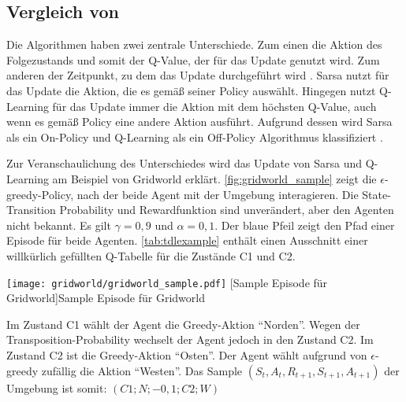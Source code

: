\subsection{Vergleich von \bothAlgs}
\label{chap:vergleich}

Die Algorithmen \bothAlgs haben zwei zentrale Unterschiede. 
Zum einen die Aktion des Folgezustands und somit der Q-Value, der für das Update genutzt wird. 
Zum anderen der Zeitpunkt, zu dem das Update durchgeführt wird \cite{IrelandComparisonThereFundamental}. 
Sarsa nutzt für das Update die Aktion, die es gemäß seiner Policy auswählt. 
Hingegen nutzt Q-Learning für das Update immer die Aktion mit dem höchsten Q-Value, auch wenn es gemäß Policy eine andere Aktion ausführt. 
Aufgrund dessen wird Sarsa als ein On-Policy und Q-Learning als ein Off-Policy Algorithmus klassifiziert \cite[S. 132]{suttonReinforcementLearningIntroduction2018}.

Zur Veranschaulichung des Unterschiedes wird das Update von Sarsa und Q-Learning am Beispiel von Gridworld erklärt. 
\cref{fig:gridworld_sample} zeigt die $\epsilon$-greedy-Policy, nach der beide Agent mit der Umgebung interagieren. 
Die State-Transition Probability und Rewardfunktion sind unverändert, aber den Agenten nicht bekannt.
Es gilt $\gamma=0,9$ und $\alpha=0,1$.
Der blaue Pfeil zeigt den Pfad einer Episode für beide Agenten. 
\cref{tab:tdlexample} enthält einen Ausschnitt einer willkürlich gefüllten Q-Tabelle für die Zustände C1 und C2.

\begin{minipage}{\textwidth}
  \begin{minipage}[b]{0.49\textwidth}
    \centering
    \captionsetup{type=figure}
    \texttt{[image: gridworld/gridworld\_sample.pdf]}
    [Sample Episode für Gridworld]{Sample Episode für Gridworld\protect\footnotemark}
    \label{fig:gridworld_sample}
  \end{minipage}
  \hfill
  \begin{minipage}[b]{0.49\textwidth}
    \centering
    \captionsetup{type=table}
    
    \label{tab:tdlexample}
    \end{minipage}
\end{minipage}

Im Zustand C1 wählt der Agent die Greedy-Aktion “Norden”. Wegen der Transposition-Probability wechselt der Agent jedoch in den Zustand C2. Im Zustand C2 ist die Greedy-Aktion “Osten”. Der Agent wählt aufgrund von $\epsilon$-greedy zufällig die Aktion “Westen”. Das Sample $(S_t,A_t,R_{t+1},S_{t+1},A_{t+1})$ der Umgebung ist somit: $(C1;N;-0,1;C2;W)$ 

